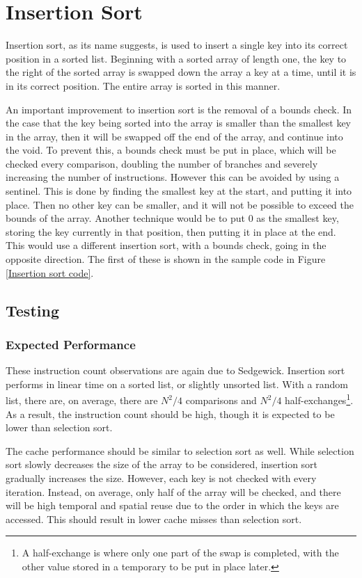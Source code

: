 \section{Insertion Sort}

Insertion sort, as its name suggests, is used to insert a single key into its
correct position in a sorted list. Beginning with a sorted array of length one,
the key to the right of the sorted array is swapped down the array a key at a
time, until it is in its correct position. The entire array is sorted in this
manner.

An important improvement to insertion sort is the removal of a bounds check. In
the case that the key being sorted into the array is smaller than the smallest
key in the array, then it will be swapped off the end of the array, and continue
into the void. To prevent this, a bounds check must be put in place, which will
be checked every comparison, doubling the number of branches and severely
increasing the number of instructions. However this can be avoided by using a
sentinel. This is done by finding the smallest key at the start, and putting it
into place. Then no other key can be smaller, and it will not be possible to
exceed the bounds of the array. Another technique would be to put $0$ as the
smallest key, storing the key currently in that position, then putting it in
place at the end. This would use a different insertion sort, with a bounds
check, going in the opposite direction. The first of these is shown in the
sample code in Figure \vref{Insertion sort code}.

\subsection{Testing}
\subsubsection{Expected Performance}
These instruction count observations are again due to Sedgewick.  Insertion sort
performs in linear time on a sorted list, or slightly unsorted list. With a
random list, there are, on average, there are $N^2/4$ comparisons and $N^2/4$
half-exchanges\footnote{A half-exchange is where only one part of the swap is
completed, with the other value stored in a temporary to be put in place later.}.
As a result, the instruction count should be high, though it is expected to be
lower than selection sort.

The cache performance should be similar to selection sort as well. While
selection sort slowly decreases the size of the array to be considered,
insertion sort gradually increases the size. However, each key is not checked
with every iteration. Instead, on average, only half of the array will be
checked, and there will be high temporal and spatial reuse due to the order in
which the keys are accessed. This should result in lower cache misses than
selection sort.

